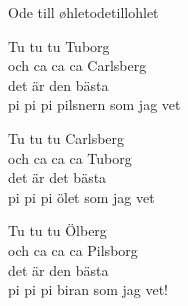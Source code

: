 \begin{song}{Ode till øhlet}{odetillohlet}
\begin{vers}
Tu tu tu Tuborg\\
och ca ca ca Carlsberg\\
det är den bästa\\
pi pi pi pilsnern som jag vet\\
\end{vers}
\begin{vers}
Tu tu tu Carlsberg\\
och ca ca ca Tuborg\\
det är det bästa\\
pi pi pi ölet som jag vet\\
\end{vers}
\begin{vers}
Tu tu tu Ölberg\\
och ca ca ca Pilsborg\\
det är den bästa\\
pi pi pi biran som jag vet!\\
\end{vers}
\end{song}
